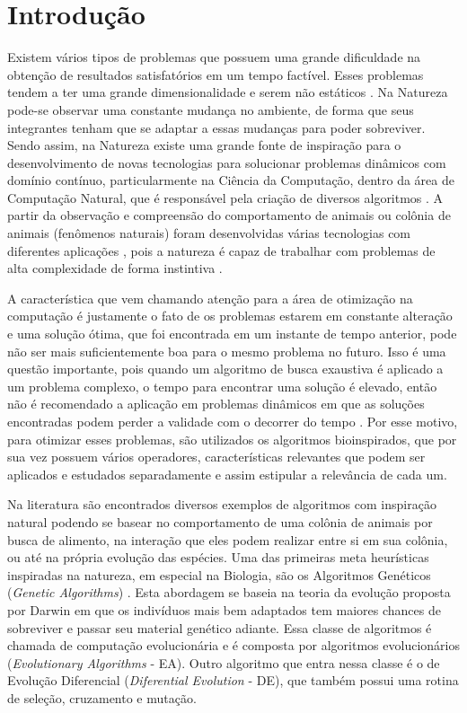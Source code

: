\chapter{Introdução}
\label{ch:intro}

Existem vários tipos de problemas que possuem uma grande dificuldade na obtenção de resultados satisfatórios em um tempo factível. Esses problemas tendem a ter uma grande dimensionalidade e serem não estáticos \cite{de2004otimizaccao}. Na Natureza pode-se observar uma constante mudança no ambiente, de forma que seus integrantes tenham que se adaptar a essas mudanças para poder sobreviver. Sendo assim, na Natureza existe uma grande fonte de inspiração para o desenvolvimento de novas tecnologias para solucionar problemas dinâmicos com domínio contínuo, particularmente na Ciência da Computação, dentro da área de Computação Natural, que é responsável pela criação de diversos algoritmos \cite{de2007fundamentals}. A partir da observação e compreensão do comportamento de animais ou colônia de animais (fenômenos naturais) foram desenvolvidas várias tecnologias com diferentes aplicações \cite{rozenberg2011handbook}, pois a natureza é capaz de trabalhar com problemas de alta complexidade de forma instintiva \cite{andre2015multiple}.

A característica que vem chamando atenção para a área de otimização na computação é justamente o fato de os problemas estarem em constante alteração e uma solução ótima, que foi encontrada em um instante de tempo anterior, pode não ser mais suficientemente boa para o mesmo problema no futuro. Isso é uma questão importante, pois quando um algoritmo de busca exaustiva é aplicado a um problema complexo, o tempo para encontrar uma solução é elevado, então não é recomendado a aplicação em problemas dinâmicos em que as soluções encontradas podem perder a validade com o decorrer do tempo \cite{morrison2003performance}. Por esse motivo, para otimizar esses problemas, são utilizados os algoritmos bioinspirados, que por sua vez possuem vários operadores, características relevantes que podem ser aplicados e estudados separadamente e assim estipular a relevância de cada um.

Na literatura são encontrados diversos exemplos de algoritmos com inspiração natural podendo se basear no comportamento de uma colônia de animais por busca de alimento, na interação que eles podem realizar entre si em sua colônia, ou até na própria evolução das espécies. Uma das primeiras meta heurísticas inspiradas na natureza, em especial na Biologia, são os Algoritmos Genéticos (\textit{Genetic Algorithms}) \cite{holland1975adaptation}. Esta abordagem se baseia na teoria da evolução proposta por Darwin em que os indivíduos mais bem adaptados tem maiores chances de sobreviver e passar seu material genético adiante. Essa classe de algoritmos é chamada de computação evolucionária e é composta por algoritmos evolucionários (\textit{Evolutionary Algorithms} - EA). Outro algoritmo que entra nessa classe é o de Evolução Diferencial (\textit{Diferential Evolution} - DE), que também possui uma rotina de seleção, cruzamento e mutação.

